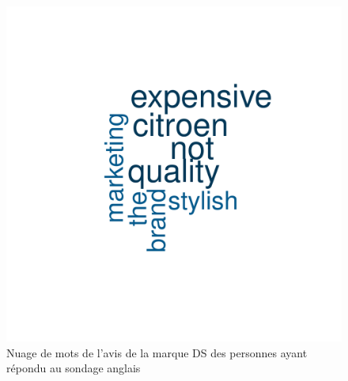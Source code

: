 \documentclass[12pt]{article}\usepackage[]{graphicx}\usepackage[]{color}
\makeatletter
\def\maxwidth{ %
  \ifdim\Gin@nat@width>\linewidth
    \linewidth
  \else
    \Gin@nat@width
  \fi
}
\newenvironment{knitrout}{}{} %
\makeatother
\begin{document}
\begin{knitrout}
\color{fgcolor}\begin{figure}[H]
\includegraphics[width=\maxwidth]{figure/differences_en-1} \caption[Nuage de mots de l'avis de la marque DS des personnes ayant répondu au sondage anglais]{Nuage de mots de l'avis de la marque DS des personnes ayant répondu au sondage anglais}\label{fig:differences en}
\end{figure}


\end{knitrout}

\printbibliography%
\end{document}
